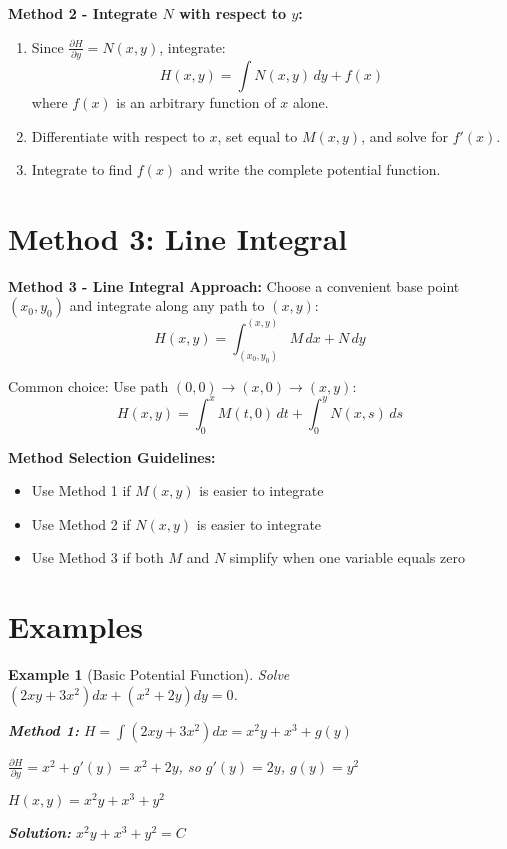 \documentclass[12pt]{article}
\newtheorem{example}{Example}
\begin{document}
\begin{algorithm}
\textbf{Method 2 - Integrate $N$ with respect to $y$:}
\begin{enumerate}
    \item Since $\frac{\partial H}{\partial y} = N(x,y)$, integrate:
    \[H(x,y) = \int N(x,y)\,dy + f(x)\]
    where $f(x)$ is an arbitrary function of $x$ alone.

    \item Differentiate with respect to $x$, set equal to $M(x,y)$, and solve for $f'(x)$.
    \item Integrate to find $f(x)$ and write the complete potential function.
\end{enumerate}
\end{algorithm}

\section{Method 3: Line Integral}

\begin{algorithm}
\textbf{Method 3 - Line Integral Approach:}
Choose a convenient base point $(x_0, y_0)$ and integrate along any path to $(x,y)$:
\[H(x,y) = \int_{(x_0,y_0)}^{(x,y)} M\,dx + N\,dy\]

Common choice: Use path $(0,0) \to (x,0) \to (x,y)$:
\[H(x,y) = \int_0^x M(t,0)\,dt + \int_0^y N(x,s)\,ds\]
\end{algorithm}

\begin{keypoint}
\textbf{Method Selection Guidelines:}
\begin{itemize}
    \item Use Method 1 if $M(x,y)$ is easier to integrate
    \item Use Method 2 if $N(x,y)$ is easier to integrate  
    \item Use Method 3 if both $M$ and $N$ simplify when one variable equals zero
\end{itemize}
\end{keypoint}

\section{Examples}

\begin{example}[Basic Potential Function]
Solve $(2xy + 3x^2)dx + (x^2 + 2y)dy = 0$.

\textbf{Method 1:} $H = \int (2xy + 3x^2)dx = x^2y + x^3 + g(y)$

$\frac{\partial H}{\partial y} = x^2 + g'(y) = x^2 + 2y$, so $g'(y) = 2y$, $g(y) = y^2$

$H(x,y) = x^2y + x^3 + y^2$

\textbf{Solution:} $x^2y + x^3 + y^2 = C$
\end{example}
\end{document}
